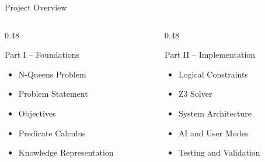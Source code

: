 \documentclass[aspectratio=169,12pt]{beamer}
\begin{document}
\begin{frame}{Project Overview}

\begin{columns}[T,totalwidth=\textwidth]

\begin{column}{0.48\textwidth}

\begin{block}{Part I -- Foundations}

\begin{itemize}
    \item N-Queens Problem
    \item Problem Statement
    \item Objectives
    \item Predicate Calculus
    \item Knowledge Representation
\end{itemize}

\end{block}

\end{column}

\begin{column}{0.48\textwidth}

\begin{block}{Part II -- Implementation}

\begin{itemize}
    \item Logical Constraints
    \item Z3 Solver
    \item System Architecture
    \item AI and User Modes
    \item Testing and Validation
\end{itemize}

\end{block}

\end{column}

\end{columns}

\end{frame}

\end{document}
